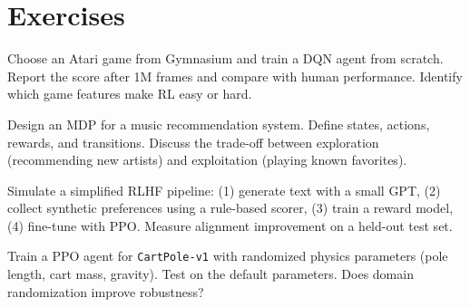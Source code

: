 \section{Exercises}
\label{sec:app:exercises}

\begin{exercise}
Choose an Atari game from Gymnasium and train a DQN agent from scratch.
Report the score after 1M frames and compare with human performance.
Identify which game features make RL easy or hard.
\end{exercise}

\begin{exercise}
Design an MDP for a music recommendation system. Define states, actions,
rewards, and transitions. Discuss the trade-off between exploration
(recommending new artists) and exploitation (playing known favorites).
\end{exercise}

\begin{exercise}
Simulate a simplified RLHF pipeline: (1) generate text with a small GPT,
(2) collect synthetic preferences using a rule-based scorer, (3) train a
reward model, (4) fine-tune with PPO. Measure alignment improvement on
a held-out test set.
\end{exercise}

\begin{exercise}
Train a PPO agent for \texttt{CartPole-v1} with randomized physics
parameters (pole length, cart mass, gravity). Test on the default
parameters. Does domain randomization improve robustness?
\end{exercise}
